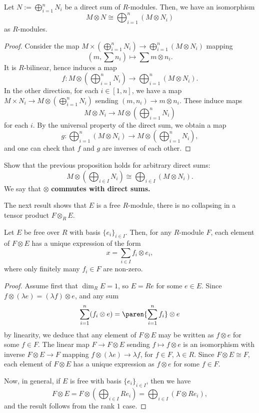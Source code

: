 \begin{prop}
    Let $N:= \bigoplus _{i=1}^nN_i$ be a direct sum of $R$-modules. Then, we have an isomorphism
    $$M \otimes N \cong \bigoplus_{i=1}^n (M \otimes N_i)$$
    as $R$-modules.
\end{prop}

\begin{proof}
    Consider the map $M \times (\bigoplus_{i=1}^n N_i) \to \bigoplus_{i=1}^n(M \otimes N_i)$ mapping
    $$(m, \sum n_i) \mapsto \sum m \otimes n_i.$$
    It is $R$-bilinear, hence induces a map
    $$f : M \otimes (\bigoplus_{i=1}^nN_i) \to \bigoplus_{i=1}^n (M \otimes N_i).$$
    In the other direction, for each $i \in [1,n]$, we have a map $M \times N_i \to M \otimes (\bigoplus_{i=1}^nN_i)$ sending $(m,n_i) \to m \otimes n_i$. These induce maps
    $$M \otimes N_i \to M \otimes (\bigoplus_{i=1}^nN_i)$$
    for each $i$. By the universal property of the direct sum, we obtain a map
    $$g: \bigoplus_{i=1}^n (M \otimes N_i) \to M \otimes (\bigoplus_{i=1}^n N_i),$$
    and one can check that $f$ and $g$ are inverses of each other.
\end{proof}

\begin{notebox*}[Exercise]
    Show that the previous proposition holds for arbitrary direct sums:
    $$M \otimes (\bigoplus_{i \in I}N_i) \cong \bigoplus_{i \in I}(M \otimes N_i).$$
    We say that $\otimes$ \textbf{commutes with direct sums.}
\end{notebox*}

The next result shows that $E$ is a free $R$-module, there is no collapsing in a tensor product $F \otimes _RE$.

\begin{prop}
    Let $E$ be free over $R$ with basis $\{ e_i\}_{i \in I}$. Then, for any $R$-module $F$, each element of $F \otimes E$ has a unique expression of the form
    $$x = \sum_{i \in I}f _i \otimes e_i,$$
    where only finitely many $f_i \in F$ are non-zero.
\end{prop}

\begin{proof}
    Assume first that $\dim _R E=1$, so $E = Re$ for some $e \in E$. Since $f \otimes (\lambda e)= (\lambda f) \otimes e$, and any sum
    $$\sum_{i=1}^n (f_i \otimes e)= \paren{\sum_{i=1}^n f_i}\otimes e$$
    by linearity, we deduce that any element of $F \otimes E$ may be written as $f \otimes e$ for some $f \in F$. The linear map $F \to F \otimes E$ sending $f \mapsto f \otimes e$ is an isomorphism with inverse $F \otimes E \to F$ mapping $f \otimes (\lambda e) \to \lambda f$, for $f \in F$, $\lambda \in R$. Since $F \otimes E \cong F$, each element of $F \otimes E$ has a unique expression as $f \otimes e$ for some $f \in F$.

    Now, in general, if $E$ is free with basis $\{e_i\}_{i \in I}$, then we have
    $$F \otimes E = F \otimes (\bigoplus_{i \in I}Re_i) = \bigoplus_{i \in I}(F \otimes Re_i),$$
    and the result follows from the rank $1$ case.
\end{proof}

